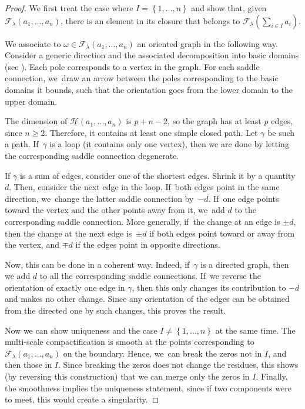 \documentclass[JEP,XML,SOM,Unicode,NoFloatCountersInSection,published]{cedram}
\theoremstyle{definition}
\begin{document}
\begin{proof}
We first treat the case where $I=\left\{1,\dots,n\right\}$ and show that, given $\mathcal{F}_{\lambda}(a_{1},\dots,a_{n})$, there is an element in its closure that belongs to $\mathcal{F}_{\lambda}(\sum_{i\in I} a_{i})$.

We associate to $\omega\in \mathcal{F}_{\lambda}(a_{1},\dots,a_{n})$ an oriented graph in the following way. Consider a generic direction and the associated decomposition into basic domains (see \cite[\S 3.3]{Bo}). Each pole corresponds to a vertex in the graph. For each saddle connection, we~draw an arrow between the poles corresponding to the basic domains it bounds, such that the orientation goes from the lower domain to the upper domain.

The dimension of $\mathcal{H}(a_{1},\dots,a_{n})$ is $p+n-2$, so the graph has at least $p$ edges, since $n\geq2$. Therefore, it contains at least one simple closed path. Let $\gamma$ be such a path. If~$\gamma$ is a loop (\ie it contains only one vertex), then we are done by letting the corresponding saddle connection degenerate.

If $\gamma$ is a sum of edges, consider one of the shortest edges. Shrink it by a quantity $d$. Then, consider the next edge in the loop. If~both edges point in the same direction, we~change the latter saddle connection by~$-d$. If~one edge points toward the vertex and the other points away from it, we~add $d$ to the corresponding saddle connection. More generally, if~the change at an edge is $\pm d$, then the change at the next edge is~$\pm d$ if both edges point toward or away from the vertex, and $\mp d$ if the edges point in opposite directions.

Now, this can be done in a coherent way. Indeed, if~$\gamma$ is a directed graph, then we add $d$ to all the corresponding saddle connections. If~we reverse the orientation of exactly one edge in $\gamma$, then this only changes its contribution to $-d$ and makes no other change. Since any orientation of the edges can be obtained from the directed one by such changes, this proves the result.

Now we can show uniqueness and the case $I \neq \left\{1,\dots,n\right\}$ at the same time. The multi-scale compactification is smooth at the points corresponding to $\mathcal{F}_{\lambda}(a_{1},\dots,a_{n})$ on the boundary. Hence, we~can break the zeros not in $I$, and then those in $I$. Since breaking the zeros does not change the residues, this shows (by reversing this construction) that we can merge only the zeros in $I$. Finally, the smoothness implies the uniqueness statement, since if two components were to meet, this would create a singularity.
\end{proof}
\end{document}
